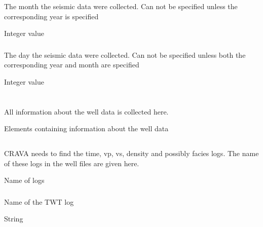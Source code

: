  \subsubsection{}
 \slist
   \item \Description The month the seismic data were collected. Can not be specified unless the corresponding year is specified
   \item \Argument Integer value
   \item \Default 
 \elist
 
  \subsubsection{}
 \slist
   \item \Description The day the seismic data were collected. Can not be specified unless both the corresponding year and month are specified
   \item \Argument Integer value
   \item \Default 
 \elist


\section{} 
 \slist
   \item \Description All information about the well data is collected here.
   \item \Argument Elements containing information about the well data
   \item \Default
 \elist

\subsection{} 
 \slist
   \item \Description CRAVA needs to find the time, vp, vs, density and possibly facies logs. The name of these logs in the well files are given here.
   \item \Argument Name of logs
   \item \Default
 \elist

\subsubsection{} 
 \slist
   \item \Description Name of the TWT log
   \item \Argument String
   \item \Default %
 \elist

